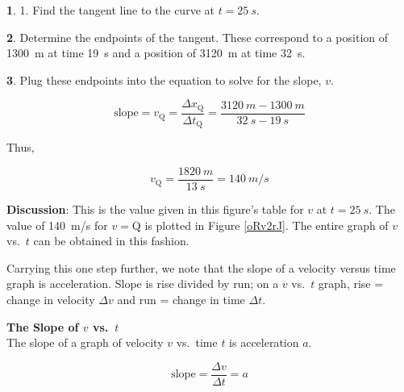 \documentclass[main-ap-physics.tex]{subfiles}
\begin{document}
\vspace{1em}

\textbf{1}. 1. Find the tangent line to the curve at $t = \SI{25}{s}$.

\vspace{1em}

\textbf{2}. Determine the endpoints of the tangent. These correspond to a position of \SI{1300}{m} at time \SI{19}{s} and a position of \SI{3120}{m} at time \SI{32}{s}.

\vspace{1em}

\textbf{3}. Plug these endpoints into the equation to solve for the slope, $v$.

\begin{equation*}
    \text{slope} = v_{\text{Q}} = \frac{\Delta x_{\text{Q}}}{\Delta t_{\text{Q}}} = \frac{\SI{3120}{m} - \SI{1300}{m}}{\SI{32}{s} - \SI{19}{s}}
\end{equation*}

Thus,

\begin{equation*}
    v_{\text{Q}} = \frac{\SI{1820}{m}}{\SI{13}{s}} = \SI{140}{m/s}
\end{equation*}

\textbf{Discussion}: This is the value given in this figure's table for $v$ at  $t = \SI{25}{s}$. The value of \SI{140}{m/s} for $v={\text{Q}}$ is plotted in Figure \ref{oRv2rJ}. The entire graph of $v$ vs.~$t$ can be obtained in this fashion.

\vspace{1ex}

\endsolution

\vspace{1em}

Carrying this one step further, we note that the slope of a velocity versus time graph is acceleration. Slope is rise divided by run; on a $v$ vs.~$t$ graph, rise = change in velocity $\Delta v$ and run = change in time $\Delta t$.

\begin{mdframed}[backgroundcolor=black!10]
    \textbf{The Slope of $v$ vs.~$t$}\\
    The slope of a graph of velocity $v$ vs.~time $t$ is acceleration $a$.

    \begin{equation*}
        \text{slope} = \frac{\Delta v}{\Delta t} = a
    \end{equation*}
\end{mdframed}
\end{document}
